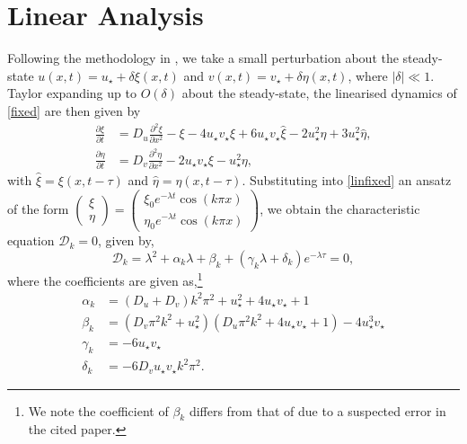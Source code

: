 \section{Linear Analysis}
Following the methodology in \cite{yigaffneyli}, we take a small perturbation about the steady-state $u(x,t)=u_\star+\delta\xi(x,t)$ and $v(x,t)=v_\star+\delta\eta(x,t)$, where $|\delta|\ll 1$. Taylor expanding up to $O(\delta)$ about the steady-state, the linearised dynamics of \eqref{fixed} are then given by
\begin{equation}\label{linfixed}
  \begin{split}
\frac{\partial\xi}{\partial t}&=D_u\frac{\partial^2\xi}{\partial x^2}-\xi-4u_\star v_\star\xi+6u_\star v_\star\hat{\xi}-2u_\star^2\eta+3u_\star^2\hat{\eta},\\
\frac{\partial\eta}{\partial t}&=D_v\frac{\partial^2\eta}{\partial x^2}-2u_\star v_\star\xi-u_\star^2\eta,
\end{split}
\end{equation}
with $\hat{\xi}=\xi(x,t-\tau)$ and $\hat{\eta}=\eta(x,t-\tau)$. Substituting into \eqref{linfixed} an ansatz of the form $\begin{pmatrix}\xi\\\eta\end{pmatrix}=\begin{pmatrix}\xi_0e^{-\lambda t}\cos(k\pi x)\\ \eta_0e^{-\lambda t}\cos(k\pi x)\end{pmatrix}$, we obtain the characteristic equation $\mathcal{D}_k=0$, given by,
\begin{equation}\label{characfix}
\mathcal{D}_k=\lambda^2+\alpha_k\lambda+\beta_k+(\gamma_k\lambda+\delta_k)e^{-\lambda\tau}=0,
\end{equation}
where the coefficients are given as,\footnote{We note the coefficient of $\beta_k$ differs from that of \cite{yigaffneyli} due to a suspected error in the cited paper.}
\begin{align}
\alpha_k&=(D_u+D_v)k^2\pi^2+u_\star^2+4u_\star v_\star+1\\
\beta_k&=(D_v\pi^2k^2+u_\star^2)(D_u\pi^2k^2+4u_\star v_\star+1)-4u_\star^3v_\star\\
\gamma_k&=-6u_\star v_\star\\
\delta_k&=-6D_vu_\star v_\star k^2\pi^2.
\end{align}
